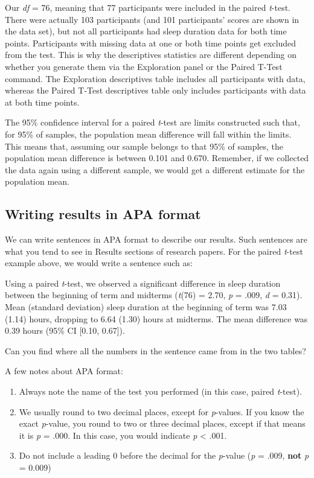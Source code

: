 \documentclass[
]{book}
\begin{document}
Our \emph{df} = 76, meaning that 77 participants were included in the paired \emph{t}-test. There were actually 103 participants (and 101 participants' scores are shown in the data set), but not all participants had sleep duration data for both time points. Participants with missing data at one or both time points get excluded from the test. This is why the descriptives statistics are different depending on whether you generate them via the {Exploration} panel or the {Paired T-Test} command. The {Exploration} descriptives table includes all participants with data, whereas the {Paired T-Test} descriptives table only includes participants with data at both time points.

The 95\% confidence interval for a paired \emph{t}-test are limits constructed such that, for 95\% of samples, the population mean difference will fall within the limits. This means that, assuming our sample belongs to that 95\% of samples, the population mean difference is between 0.101 and 0.670. Remember, if we collected the data again using a different sample, we would get a different estimate for the population mean.

\hypertarget{writing-results-in-apa-format}{%
\subsection{Writing results in APA format}\label{writing-results-in-apa-format}}

We can write sentences in APA format to describe our results. Such sentences are what you tend to see in Results sections of research papers. For the paired \emph{t}-test example above, we would write a sentence such as:

Using a paired \emph{t}-test, we observed a significant difference in sleep duration between the beginning of term and midterms (\emph{t}(76) = 2.70, \emph{p} = .009, \emph{d} = 0.31). Mean (standard deviation) sleep duration at the beginning of term was 7.03 (1.14) hours, dropping to 6.64 (1.30) hours at midterms. The mean difference was 0.39 hours (95\% CI {[}0.10, 0.67{]}).

Can you find where all the numbers in the sentence came from in the two tables?

A few notes about APA format:

\begin{enumerate}
\def\labelenumi{\arabic{enumi}.}
\item
  Always note the name of the test you performed (in this case, paired \emph{t}-test).
\item
  We usually round to two decimal places, except for \emph{p}-values. If you know the exact \emph{p}-value, you round to two or three decimal places, except if that means it is \emph{p} = .000. In this case, you would indicate \emph{p} \textless{} .001.
\item
  Do not include a leading 0 before the decimal for the \emph{p}-value (\emph{p} = .009, \textbf{not} \emph{p} = 0.009)
\end{enumerate}
\end{document}
